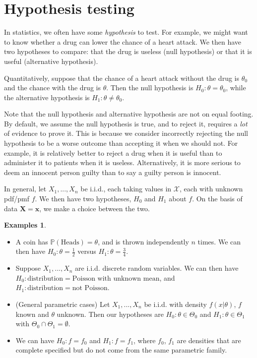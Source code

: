 \documentclass[a4paper,11pt]{article}
\theoremstyle{definition}
\newtheorem*{exs}{Examples}
\numberwithin{equation}{section}
\begin{document}
\section{Hypothesis testing}

In statistics, we often have some \emph{hypothesis} to test. For example, we might want to know whether a drug can lower the chance of a heart attack. We then have two hypotheses to compare: that the drug is useless (null hypothesis) or that it is useful (alternative hypothesis).

Quantitatively, suppose that the chance of a heart attack without the drug is $\theta_0$ and the chance with the drug is $\theta$. Then the null hypothesis is $H_0:\theta=\theta_0$, while the alternative hypothesis is $H_1:\theta\neq\theta_0$.

Note that the null hypothesis and alternative hypothesis are not on equal footing. By default, we assume the null hypothesis is true, and to reject it, requires a \emph{lot} of evidence to prove it. This is because we consider incorrectly rejecting the null hypothesis to be a worse outcome than accepting it when we should not. For example, it is relatively better to reject a drug when it is useful than to administer it to patients when it is useless. Alternatively, it is more serious to deem an innocent person guilty than to say a guilty person is innocent.

In general, let $X_1,...,X_n$ be i.i.d., each taking values in $\mathcal{X}$, each with unknown pdf/pmf $f$. We then have two hypotheses, $H_0$ and $H_1$ about $f$. On the basis of data $\mathbf{X}=\mathbf{x}$, we make a choice between the two.

\begin{exs}
\leavevmode
\begin{itemize}
    \item A coin has $\mathbb{P}(\text{Heads})=\theta$, and is thrown independently $n$ times. We can then have $H_0:\theta=\frac{1}{2}$ versus $H_1:\theta=\frac{3}{4}$.
    \item Suppose $X_1,...,X_n$ are i.i.d. discrete random variables. We can then have $H_0:\text{distribution}=\text{Poisson with unknown mean}$, and $H_1:\text{distribution}=\text{not Poisson}$.
    \item (General parametric cases) Let $X_1,...,X_n$ be i.i.d. with density $f(x|\theta)$, $f$ known and $\theta$ unknown. Then our hypotheses are $H_0:\theta\in\Theta_0$ and $H_1:\theta\in\Theta_1$ with $\Theta_0\cap\Theta_1=\emptyset$.
    \item We can have $H_0:f=f_0$ and $H_1:f=f_1$, where $f_0$, $f_1$ are densities that are complete specified but do not come from the same parametric family.
\end{itemize}
\end{exs}
\end{document}
